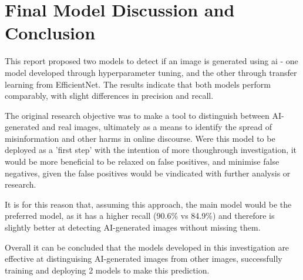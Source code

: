 \section{Final Model Discussion and Conclusion}

This report proposed two models to detect if an image is generated using ai - one model developed through hyperparameter tuning, and the other through transfer learning from EfficientNet. The results indicate that both models perform comparably, with slight differences in precision and recall.

The original research objective was to make a tool to distinguish between AI-generated and real images, ultimately as a means to identify the spread of misinformation and other harms in online discourse. Were this model to be deployed as a 'first step' with the intention of more thoughrough investigation, it would be more beneficial to be relaxed on false positives, and minimise false negatives, given the false positives would be vindicated with further analysis or research.

It is for this reason that, assuming this approach, the main model would be the preferred model, as it has a higher recall (90.6\% vs 84.9\%) and therefore is slightly better at detecting AI-generated images without missing them. 


Overall it can be concluded that the models developed in this investigation are effective at distinguising AI-generated images from other images, successfully training and deploying 2 models to make this prediction. 
